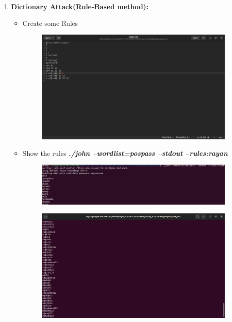 \documentclass[12pt, A4Paper]{article}
\begin{document}
\begin{enumerate}
    \item \textbf{\large{Dictionary Attack(Rule-Based method):}}
    \begin{itemize}
        \item Create some Rules\\
         \begin{figure}[H]
            \centering
            \includegraphics[width=\textwidth]{images/rule0.png}
        \end{figure}
         \item Show the rules
         \textit{\textbf{./john --wordlist=pospass --stdout --rules:rayan}}
         \begin{figure}[H]
            \centering
            \includegraphics[width=\textwidth]{images/rule9999.png}
        \end{figure}
         \begin{figure}[H]
            \centering
            \includegraphics[width=\textwidth]{images/rule11.png}

\end{figure}
\end{itemize}
\end{enumerate}
\end{document}

